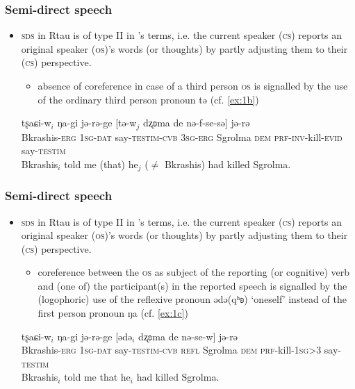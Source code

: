 \documentclass[xcolor=table]{beamer}
\newcommand{\ipa}[1]{{\phon #1}} %
\newcommand{\ipapl}[1]{{\phondroit #1}}
\newcommand{\conv}{\textsc{cvb}}
\newcommand{\const}{\textsc{testim}}
\newcommand{\dat}{\textsc{dat}}
\newcommand{\dem}{\textsc{dem}}
\newcommand{\erg}{\textsc{erg}}
\newcommand{\evid}{\textsc{evid}}
\newcommand{\inv}{\textsc{inv}}
\newcommand{\prf}{\textsc{prf}}
\newcommand{\refl}{\textsc{refl}}
\newcommand{\sg}{\textsc{sg}}
\begin{document}
\begin{frame}
\frametitle{Semi-direct speech}

\begin{itemize}
 \item \textsc{sds} in Rtau is of type II in \cite{aikhenvald08semidirect}'s terms, i.e. the current speaker (\textsc{cs}) reports an original speaker (\textsc{os})'s words (or thoughts) by partly adjusting them to their (\textsc{cs}) perspective. 
\begin{itemize}
 \item absence of coreference in case of a third person \textsc{os} is signalled by the use of the ordinary third person pronoun \ipa{tə} (cf. \ref{ex:1b})
\end{itemize}

\begin{exe}
\ex \label{ex:1b}
\gll
	\ipa{tʂaɕi-w}$_i$ \ipa{ŋa-gi}	\ipa{jə-rə-ge} [\ipapl{tə-w}$_j$	\ipapl{dʐʚma} 	\ipapl{de} \ipapl{nə-f-se-sə}] \ipa{jə-rə}  \\
	{Bkrashis-\erg} {1\sg-\dat} {say-\const-\conv} {3\sg-\erg} Sgrolma {\dem} {\prf-\inv-kill-\evid}  say-\const\\ 
	\glt Bkrashis$_i$ told me (that) he$_j$ ($\ne$ Bkrashis) had killed Sgrolma.
\end{exe}

\end{itemize}
\end{frame}

\begin{frame}
\frametitle{Semi-direct speech}

\begin{itemize}
 \item \textsc{sds} in Rtau is of type II in \cite{aikhenvald08semidirect}'s terms, i.e. the current speaker (\textsc{cs}) reports an original speaker (\textsc{os})'s words (or thoughts) by partly adjusting them to their (\textsc{cs}) perspective. 

\begin{itemize}
 \item coreference between the \textsc{os} as subject of the reporting (or cognitive) verb and (one of) the participant(s) in the reported speech is signalled by the (logophoric) use of the reflexive pronoun \ipa{ədə(qʰʚ)} `oneself' instead of the first person pronoun \ipa{ŋa} (cf. \ref{ex:1c})
\end{itemize}

\begin{exe}
\ex \label{ex:1c}
\gll
	\ipa{tʂaɕi-w}$_i$ \ipa{ŋa-gi}	\ipa{jə-rə-ge} [\ipapl{ədə}$_i$	\ipapl{dʐʚma} 	\ipapl{de} 	\ipapl{nə-se-w}] \ipa{jə-rə}  \\
	{Bkrashis-\erg} {1\sg-\dat} {say-\const-\conv} {\refl} Sgrolma {\dem} {\prf-kill-1\sg>3} say-\const\\ 
	\glt Bkrashis$_i$ told me that he$_i$ had killed Sgrolma.
\end{exe}

\end{itemize}
\end{frame}
\end{document}
